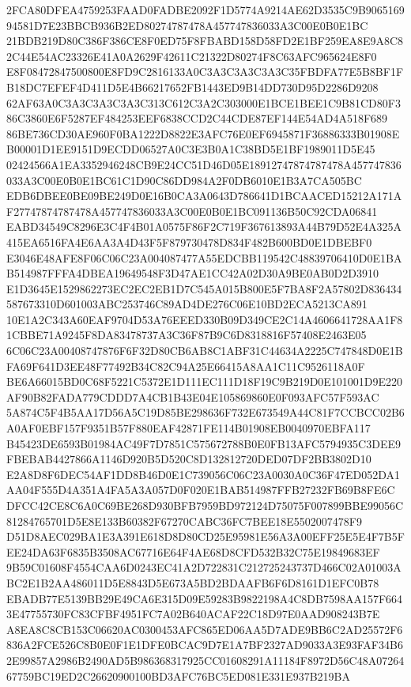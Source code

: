 \documentclass[UTF8,fontset=fandol,zihao=-4,a4paper]{ctexart}
\begin{document}
{{2FCA80DFEA4759253FAAD0FADBE2092F1D5774A9214AE62D3535C9B906516994581D7E23BBCB936B2ED80274787478A457747836033A3C00E0B0E1BC
21BDB219D80C386F386CE8F0ED75F8FBABD158D58FD2E1BF259EA8E9A8C82C44E54AC23326E41A0A2629F42611C21322D80274F8C63AFC965624E8F0
E8F08472847500800E8FD9C2816133A0C3A3C3A3C3A3C35FBDFA77E5B8BF1FB18DC7EFEF4D411D5E4B66217652FB1443ED9B14DD730D95D2286D9208
62AF63A0C3A3C3A3C3A3C313C612C3A2C303000E1BCE1BEE1C9B81CD80F386C3860E6F5287EF484253EEF6838CCD2C44CDE87EF144E54AD4A518F689
86BE736CD30AE960F0BA1222D8822E3AFC76E0EF6945871F36886333B01908EB00001D1EE9151D9ECDD06527A0C3E3B0A1C38BD5E1BF1989011D5E45
02424566A1EA3352946248CB9E24CC51D46D05E18912747874787478A457747836033A3C00E0B0E1BC61C1D90C86DD984A2F0DB6010E1B3A7CA505BC
EDB6DBEE0BE09BE249D0E16B0CA3A0643D786641D1BCAACED15212A171AF27747874787478A457747836033A3C00E0B0E1BC091136B50C92CDA06841
EABD34549C8296E3C4F4B01A0575F86F2C719F367613893A44B79D52E4A325A415EA6516FA4E6AA3A4D43F5F879730478D834F482B600BD0E1DBEBF0
E3046E48AFE8F06C06C23A004087477A55EDCBB119542C48839706410D0E1BAB514987FFFA4DBEA19649548F3D47AE1CC42A02D30A9BE0AB0D2D3910
E1D3645E1529862273EC2EC2EB1D7C545A015B800E5F7BA8F2A57802D836434587673310D601003ABC253746C89AD4DE276C06E10BD2ECA5213CA891
10E1A2C343A60EAF9704D53A76EEED330B09D349CE2C14A4606641728AA1F81CBBE71A9245F8DA83478737A3C36F87B9C6D8318816F57408E2463E05
6C06C23A00408747876F6F32D80CB6AB8C1ABF31C44634A2225C747848D0E1BFA69F641D3EE48F77492B34C82C94A25E66415A8AA1C11C9526118A0F
BE6A66015BD0C68F5221C5372E1D111EC111D18F19C9B219D0E101001D9E220AF90B82FADA779CDDD7A4CB1B43E04E105869860E0F093AFC57F593AC
5A874C5F4B5AA17D56A5C19D85BE298636F732E673549A44C81F7CCBCC02B6A0AF0EBF157F9351B57F880EAF42871FE114B01908EB0040970EBFA117
B45423DE6593B01984AC49F7D7851C575672788B0E0FB13AFC5794935C3DEE9FBEBAB4427866A1146D920B5D520C8D132812720DED07DF2BB3802D10
E2A8D8F6DEC54AF1DD8B46D0E1C739056C06C23A0030A0C36F47ED052DA1AA04F555D4A351A4FA5A3A057D0F020E1BAB514987FFB27232FB69B8FE6C
DFCC42CE8C6A0C69BE268D930BFB7959BD972124D75075F007899BBE99056C81284765701D5E8E133B60382F67270CABC36FC7BEE18E5502007478F9
D51D8AEC029BA1E3A391E618D8D80CD25E95981E56A3A00EFF25E5E4F7B5FEE24DA63F6835B3508AC67716E64F4AE68D8CFD532B32C75E19849683EF
9B59C01608F4554CAA6D0243EC41A2D722831C212725243737D466C02A01003ABC2E1B2AA486011D5E8843D5E673A5BD2BDAAFB6F6D8161D1EFC0B78
EBADB77E5139BB29E49CA6E315D09E59283B9822198A4C8DB7598AA157F6643E47755730FC83CFBF4951FC7A02B640ACAF22C18D97E0AAD908243B7E
A8EA8C8CB153C06620AC0300453AFC865ED06AA5D7ADE9BB6C2AD25572F6836A2FCE526C8B0E0F1E1DFE0BCAC9D7E1A7BF2327AD9033A3E93FAF34B6
2E99857A2986B2490AD5B986368317925CC01608291A11184F8972D56C48A0726467759BC19ED2C26620900100BD3AFC76BC5ED081E331E937B219BA
}}
\end{document}
